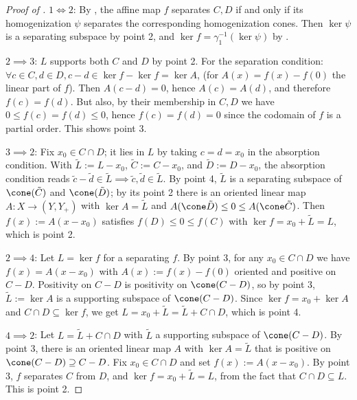 \documentclass{article}
\theoremstyle{plain}
\theoremstyle{definition}
\theoremstyle{remark}
\begin{document}
\begin{proof}[\hypertarget{loc:characterization_of_the_separating_flats.proof}{}Proof of ]

$1 \iff 2$: By , the affine map $f$ separates $C,D$ if and only if its homogenization $\psi$ separates the corresponding homogenization cones. Then $\ker \psi$ is a separating subspace by  point 2, and $\ker f = \gamma_1^{-1}(\ker \psi)$ by .

$2 \implies 3$: $L$ supports both $C$ and $D$ by  point 2. For the separation condition: $\forall c  \in C, d  \in D, c-d \in \ker f - \ker f = \ker A$, (for $A(x) = f(x)-f(0)$ the linear part of $f$).
Then $A(c-d) = 0$, hence $A(c) = A(d)$, and therefore $f(c)=f(d)$.
But also, by their membership in $C,D$ we have $0 \leq f(c) = f(d) \leq 0$, hence $f(c)=f(d)=0$ since the codomain of $f$ is a partial order. This shows point 3.

$3 \implies 2$:
Fix $x_0 \in C \cap D$; it lies in $L$ by taking $c = d = x_0$ in the absorption condition. With $\tilde{L} := L - x_0$, $\tilde{C} := C - x_0$, and $\tilde{D} := D - x_0$, the absorption condition reads $\tilde{c} - \tilde{d} \in \tilde{L} \implies \tilde{c}, \tilde{d} \in \tilde{L}$. By  point 4, $\tilde{L}$ is a separating subspace of $\cone(\tilde{C})$ and $\cone(\tilde{D})$; by its point 2 there is an oriented linear map $A:X \to (Y, Y_+)$ with $\ker A = \tilde{L}$ and $A(\cone \tilde{D}) \le 0 \le A(\cone \tilde{C})$. Then $f(x) := A(x - x_0)$ satisfies $f(D) \le 0 \le f(C)$ with $\ker f = x_0 + \tilde{L} = L$, which is point 2.

$2 \implies 4$:
Let $L = \ker f$ for a separating $f$. By  point 3, for any $x_0 \in C \cap D$ we have $f(x) = A(x - x_0)$ with $A(x) := f(x) - f(0)$ oriented and positive on $C - D$. Positivity on $C - D$ is positivity on $\cone(C-D)$, so by  point 3, $\tilde{L} := \ker A$ is a supporting subspace of $\cone(C-D)$. Since $\ker f = x_0 + \ker A$ and $C \cap D \subseteq \ker f$, we get $L = x_0 + \tilde{L} = \tilde{L} + C \cap D$, which is point 4.

$4 \implies 2$:
Let $L = \tilde{L} + C \cap D$ with $\tilde{L}$ a supporting subspace of $\cone(C-D)$. By  point 3, there is an oriented linear map $A$ with $\ker A = \tilde{L}$ that is positive on $\cone(C-D) \supseteq C - D$. Fix $x_0 \in C \cap D$ and set $f(x) := A(x - x_0)$. By  point 3, $f$ separates $C$ from $D$, and $\ker f = x_0 + \tilde{L} = L$, from the fact that $C \cap D \subseteq L$. This is point 2.
\end{proof}
\end{document}

